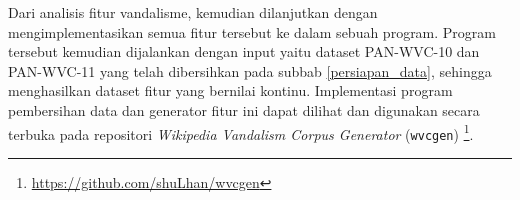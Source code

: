 Dari analisis fitur vandalisme, kemudian dilanjutkan
dengan mengimplementasikan semua fitur tersebut ke dalam sebuah program.
Program tersebut kemudian dijalankan dengan input yaitu dataset PAN-WVC-10
dan PAN-WVC-11 yang telah dibersihkan pada subbab \ref{persiapan_data},
sehingga menghasilkan dataset fitur yang bernilai kontinu.
Implementasi program pembersihan data dan generator fitur ini dapat dilihat dan
digunakan secara terbuka pada repositori \textit{Wikipedia Vandalism Corpus
Generator} (\texttt{wvcgen})
\footnote{\url{https://github.com/shuLhan/wvcgen}}.
